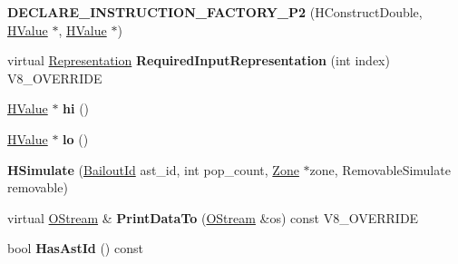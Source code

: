 \begin{DoxyCompactItemize}
\item 
\hypertarget{classv8_1_1internal_1_1_v8___f_i_n_a_l_adacf89a6185764cba5c9e51bee66496a}{}{\bfseries D\+E\+C\+L\+A\+R\+E\+\_\+\+I\+N\+S\+T\+R\+U\+C\+T\+I\+O\+N\+\_\+\+F\+A\+C\+T\+O\+R\+Y\+\_\+\+P2} (H\+Construct\+Double, \hyperlink{classv8_1_1internal_1_1_h_value}{H\+Value} $\ast$, \hyperlink{classv8_1_1internal_1_1_h_value}{H\+Value} $\ast$)\label{classv8_1_1internal_1_1_v8___f_i_n_a_l_adacf89a6185764cba5c9e51bee66496a}

\item 
\hypertarget{classv8_1_1internal_1_1_v8___f_i_n_a_l_a6c6d1f37f40b113d8f4062f1ffff7215}{}virtual \hyperlink{classv8_1_1internal_1_1_representation}{Representation} {\bfseries Required\+Input\+Representation} (int index) V8\+\_\+\+O\+V\+E\+R\+R\+I\+D\+E\label{classv8_1_1internal_1_1_v8___f_i_n_a_l_a6c6d1f37f40b113d8f4062f1ffff7215}

\item 
\hypertarget{classv8_1_1internal_1_1_v8___f_i_n_a_l_a87c94345e8415adaf6d9996bdb627a6b}{}\hyperlink{classv8_1_1internal_1_1_h_value}{H\+Value} $\ast$ {\bfseries hi} ()\label{classv8_1_1internal_1_1_v8___f_i_n_a_l_a87c94345e8415adaf6d9996bdb627a6b}

\item 
\hypertarget{classv8_1_1internal_1_1_v8___f_i_n_a_l_a25915b59c945d8761ad2bf8970be2e4b}{}\hyperlink{classv8_1_1internal_1_1_h_value}{H\+Value} $\ast$ {\bfseries lo} ()\label{classv8_1_1internal_1_1_v8___f_i_n_a_l_a25915b59c945d8761ad2bf8970be2e4b}

\item 
\hypertarget{classv8_1_1internal_1_1_v8___f_i_n_a_l_affb5388bcad28824c06b7aa67cbae19b}{}{\bfseries H\+Simulate} (\hyperlink{classv8_1_1internal_1_1_bailout_id}{Bailout\+Id} ast\+\_\+id, int pop\+\_\+count, \hyperlink{classv8_1_1internal_1_1_zone}{Zone} $\ast$zone, Removable\+Simulate removable)\label{classv8_1_1internal_1_1_v8___f_i_n_a_l_affb5388bcad28824c06b7aa67cbae19b}

\item 
\hypertarget{classv8_1_1internal_1_1_v8___f_i_n_a_l_ac450dad970b14246be761ccf5004924b}{}virtual \hyperlink{classv8_1_1internal_1_1_o_stream}{O\+Stream} \& {\bfseries Print\+Data\+To} (\hyperlink{classv8_1_1internal_1_1_o_stream}{O\+Stream} \&os) const V8\+\_\+\+O\+V\+E\+R\+R\+I\+D\+E\label{classv8_1_1internal_1_1_v8___f_i_n_a_l_ac450dad970b14246be761ccf5004924b}

\item 
\hypertarget{classv8_1_1internal_1_1_v8___f_i_n_a_l_a17856150df0139f621cc9207203fcde9}{}bool {\bfseries Has\+Ast\+Id} () const \label{classv8_1_1internal_1_1_v8___f_i_n_a_l_a17856150df0139f621cc9207203fcde9}


\end{DoxyCompactItemize}
